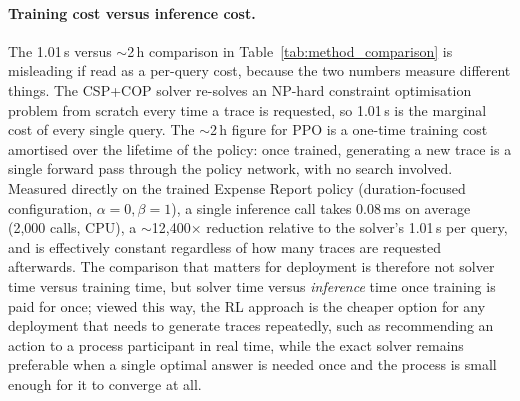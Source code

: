\paragraph{Training cost versus inference cost.} The 1.01\,s versus $\sim$2\,h comparison in Table~\ref{tab:method_comparison} is misleading if read as a per-query cost, because the two numbers measure different things. The CSP+COP solver re-solves an NP-hard constraint optimisation problem from scratch every time a trace is requested, so 1.01\,s is the marginal cost of every single query. The $\sim$2\,h figure for \ac{PPO} is a one-time training cost amortised over the lifetime of the policy: once trained, generating a new trace is a single forward pass through the policy network, with no search involved. Measured directly on the trained Expense Report policy (duration-focused configuration, $\alpha{=}0,\beta{=}1$), a single inference call takes $0.08$\,ms on average (2{,}000 calls, CPU), a $\sim$12{,}400$\times$ reduction relative to the solver's 1.01\,s per query, and is effectively constant regardless of how many traces are requested afterwards. The comparison that matters for deployment is therefore not solver time versus training time, but solver time versus \emph{inference} time once training is paid for once; viewed this way, the \ac{RL} approach is the cheaper option for any deployment that needs to generate traces repeatedly, such as recommending an action to a process participant in real time, while the exact solver remains preferable when a single optimal answer is needed once and the process is small enough for it to converge at all.

